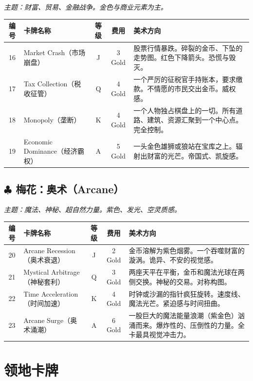 \documentclass[a4paper,11pt]{article}
\begin{document}
\textit{主题：财富、贸易、金融战争。金色与商业元素为主。}

\begin{longtable}{@{} c p{2.2cm} c c p{5.3cm} @{}}
\toprule
\textbf{编号} & \textbf{卡牌名称} & \textbf{等级} & \textbf{费用} & \textbf{美术方向} \\
\midrule
\endhead
16 & Market Crash（市场崩盘） & J & 3 Gold & 股票行情暴跌。碎裂的金币、下坠的走势图。红色下降箭头。恐慌与毁灭。 \\
\midrule
17 & Tax Collection（税收征管） & Q & 4 Gold & 一个严厉的征税官手持账本，要求缴款。不情愿的市民交出金币。威权感。 \\
\midrule
18 & Monopoly（垄断） & K & 4 Gold & 一个人物独占棋盘上的一切。所有道路、建筑、资源汇聚到一个中心点。完全控制。 \\
\midrule
19 & Economic Dominance（经济霸权） & A & 5 Gold & 一头金色雄狮或狼站在宝库之上。辐射出财富的光芒。帝国式、凯旋感。 \\
\bottomrule
\end{longtable}

\subsection*{$\clubsuit$ 梅花：奥术（Arcane）}

\textit{主题：魔法、神秘、超自然力量。紫色、发光、空灵质感。}

\begin{longtable}{@{} c p{2.2cm} c c p{5.3cm} @{}}
\toprule
\textbf{编号} & \textbf{卡牌名称} & \textbf{等级} & \textbf{费用} & \textbf{美术方向} \\
\midrule
\endhead
20 & Arcane Recession（奥术衰退） & J & 2 Gold & 金币溶解为紫色烟雾。一个吞噬财富的漩涡。诡异、不安的视觉感。 \\
\midrule
21 & Mystical Arbitrage（神秘套利） & Q & 3 Gold & 两座天平在平衡，金币和魔法光球在两侧交换。神秘的交易。对称构图。 \\
\midrule
22 & Time Acceleration（时间加速） & K & 4 Gold & 时钟或沙漏的指针疯狂旋转。速度线、魔法光芒。紧迫感与时间扭曲。 \\
\midrule
23 & Arcane Surge（奥术涌潮） & A & 6 Gold & 一股巨大的魔法能量浪潮（紫金色）汹涌而来。爆炸性的、压倒性的力量。全卡最具视觉冲击力。 \\
\bottomrule
\end{longtable}

\newpage

\section{领地卡牌}
\end{document}
